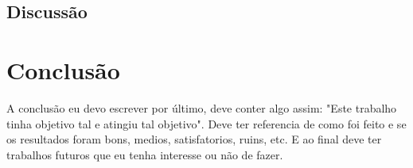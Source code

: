 \section{Discussão}

\chapter{Conclusão}

A conclusão eu devo escrever por último, deve conter algo assim: "Este trabalho tinha objetivo tal e atingiu tal objetivo". Deve ter referencia de como foi feito e se os resultados foram bons, medios, satisfatorios, ruins, etc. E ao final deve ter trabalhos futuros que eu tenha interesse ou não de fazer.
